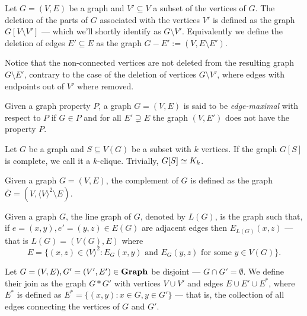 \begin{definition}
\label{def: deletion-graph}
Let \(G = (V, E)\) be a graph and \(V' \subseteq V\) a subset of the
vertices of \(G\). The deletion of the parts of \(G\) associated with the
vertices \(V'\) is defined as the graph \(G[V \setminus V']\) --- which we'll
shortly identify as \(G \setminus V'\). Equivalently we define the deletion
of edges \(E' \subseteq E\) as the graph \(G - E' := (V, E \setminus E')\).
\end{definition}

Notice that the non-connected vertices are not deleted from the resulting graph
\(G \setminus E'\), contrary to the case of the deletion of vertices \(G
\setminus V'\), where edges with endpoints out of \(V'\) where removed.

\begin{definition}
\label{def: edge-maximal}
Given a graph property \(P\), a graph \(G = (V, E)\) is said to be
\emph{edge-maximal} with respect to \(P\) if \(G \in P\) and for all \(E'
\supsetneq E\) the graph \((V, E')\) does not have the property \(P\).
\end{definition}

\begin{definition}[Clique]\label{def: clique}
Let \(G\) be a graph and \(S \subseteq V(G)\) be a subset with \(k\) vertices.
If the graph \(G[S]\) is complete, we call it a \(k\)-clique. Trivially,
\(G[S] \simeq K_k\).
\end{definition}

\begin{definition}\label{def: complement-graph}
Given a graph \(G = (V, E)\), the complement of \(G\) is defined as the graph
\(\overline G = (V, \langle V \rangle^2 \setminus E)\).
\end{definition}

\begin{definition}\label{def: line-graph}
Given a graph \(G\), the line graph of \(G\), denoted by \(L(G)\), is the
graph such that, if \(e = (x, y), e' = (y, z) \in E(G)\) are adjacent edges
then \(E_{L(G)}(x, z)\) --- that is \(L(G) = (V(G), E)\) where
\[
  E = \{(x, z) \in \langle V \rangle^2 : E_G(x, y) \text{ and } E_G(y, z)
  \text{ for some } y \in V(G)\}.
\]
\end{definition}

\begin{definition}[Join]\label{def: graph-join}
Let \(G = (V, E), G' = (V', E') \in {\textbf{Graph}}\) be disjoint --- \(G \cap G' =
\emptyset\). We define their join as the graph \(G * G'\) with vertices \(V
\cup V'\) and edges \(E \cup E' \cup E^*\), where \(E^*\) is defined as \(E^*
= \{(x, y) : x \in G, y \in G'\}\) --- that is, the collection of all edges
connecting the vertices of \(G\) and \(G'\).
\end{definition}

